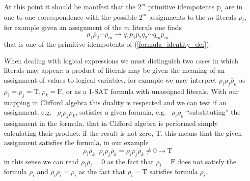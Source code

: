 \documentclass[a4paper,twoside,11pt]{article}
\begin{document}
At this point it should be manifest that the $2^m$ primitive idempotents ${\mathbb{p}}_i$ are in one to one correspondence with the possible $2^m$ assignments to the $m$ literals ${\ensuremath{\rho}}_i$, for example given an assignment of the $m$ literals one finds
$$
{\ensuremath{\rho}}_1 {\overline{\ensuremath{\rho}}}_2 \cdots {\ensuremath{\rho}}_m \to q_1 p_1 p_2 q_2 \cdots q_m p_m
$$
that is one of the primitive idempotents of (\ref{formula_identity_def}).

When dealing with logical expressions we must distinguish two cases in which literals may appear: a product of literals may be given the meaning of an assignment of values to logical variables, for example we may interpret ${\ensuremath{\rho}}_i {\ensuremath{\rho}}_j {\overline{\ensuremath{\rho}}}_k$ as ${\ensuremath{\rho}}_i = {\ensuremath{\rho}}_j = \mathrm{T}, {\ensuremath{\rho}}_k = \mathrm{F}$, or as a 1-{\ensuremath{\mbox{SAT}}}{} formula with unassigned literals. With our mapping in Clifford algebra this duality is respected and we can test if an assignment, {e.g.\ } ${\ensuremath{\rho}}_i {\ensuremath{\rho}}_j {\overline{\ensuremath{\rho}}}_k$, satisfies a given formula, {e.g.\ } ${\ensuremath{\rho}}_i {\overline{\ensuremath{\rho}}}_k$ ``substituting'' the assignment in the formula, that in Clifford algebra is performed simply calculating their product: if the result is not zero, $\mathrm{T}$, this means that the given assignment satisfies the formula, in our example
$$
{\ensuremath{\rho}}_i {\overline{\ensuremath{\rho}}}_k \; \; {\ensuremath{\rho}}_i {\ensuremath{\rho}}_j {\overline{\ensuremath{\rho}}}_k = {\ensuremath{\rho}}_i {\ensuremath{\rho}}_j {\overline{\ensuremath{\rho}}}_k \ne 0 \to \mathrm{T}
$$
in this sense we can read ${\ensuremath{\rho}}_i {\overline{\ensuremath{\rho}}}_i = 0$ as the fact that ${\ensuremath{\rho}}_i = \mathrm{F}$ does not satisfy the formula ${\ensuremath{\rho}}_i$ and ${\ensuremath{\rho}}_i {\ensuremath{\rho}}_i = {\ensuremath{\rho}}_i$ as the fact that ${\ensuremath{\rho}}_i = \mathrm{T}$ satisfies formula ${\ensuremath{\rho}}_i$.
\end{document}
